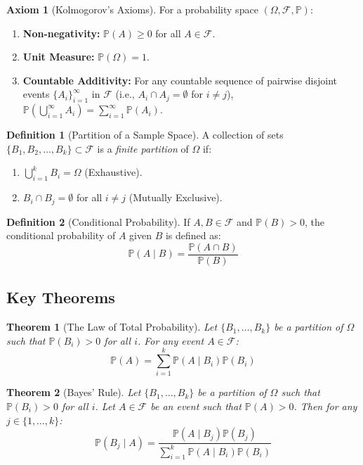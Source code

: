 \documentclass[12pt]{article}
\newtheorem{theorem}{Theorem}[section]
\theoremstyle{definition}
\newtheorem{definition}{Definition}[section]
\newtheorem{axiom}{Axiom}[section]
\theoremstyle{remark}
\newcommand{\Pbb}{\mathbb{P}}
\newcommand{\Fcal}{\mathcal{F}}
\newcommand{\OmegaSet}{\Omega}
\begin{document}
\begin{axiom}[Kolmogorov's Axioms]
For a probability space $(\OmegaSet, \Fcal, \Pbb)$:
\begin{enumerate}
    \item \textbf{Non-negativity:} $\Pbb(A) \ge 0$ for all $A \in \Fcal$.
    \item \textbf{Unit Measure:} $\Pbb(\OmegaSet) = 1$.
    \item \textbf{Countable Additivity:} For any countable sequence of pairwise disjoint events $\{A_i\}_{i=1}^{\infty}$ in $\Fcal$ (i.e., $A_i \cap A_j = \emptyset$ for $i \neq j$), $\Pbb\left(\bigcup_{i=1}^{\infty} A_i\right) = \sum_{i=1}^{\infty} \Pbb(A_i)$.
\end{enumerate}
\end{axiom}

\begin{definition}[Partition of a Sample Space]
A collection of sets $\{B_1, B_2, \dots, B_k\} \subset \Fcal$ is a \textit{finite partition} of $\OmegaSet$ if:
\begin{enumerate}
    \item $\bigcup_{i=1}^k B_i = \OmegaSet$ (Exhaustive).
    \item $B_i \cap B_j = \emptyset$ for all $i \neq j$ (Mutually Exclusive).
\end{enumerate}
\end{definition}

\begin{definition}[Conditional Probability]
If $A, B \in \Fcal$ and $\Pbb(B) > 0$, the conditional probability of $A$ given $B$ is defined as:
\[ \Pbb(A \mid B) = \frac{\Pbb(A \cap B)}{\Pbb(B)} \]
\end{definition}

\subsection{Key Theorems}
\begin{theorem}[The Law of Total Probability]
Let $\{B_1, \dots, B_k\}$ be a partition of $\OmegaSet$ such that $\Pbb(B_i) > 0$ for all $i$. For any event $A \in \Fcal$:
\[ \Pbb(A) = \sum_{i=1}^k \Pbb(A \mid B_i)\Pbb(B_i) \]
\end{theorem}

\begin{theorem}[Bayes' Rule]
Let $\{B_1, \dots, B_k\}$ be a partition of $\OmegaSet$ such that $\Pbb(B_i) > 0$ for all $i$. Let $A \in \Fcal$ be an event such that $\Pbb(A) > 0$. Then for any $j \in \{1, \dots, k\}$:
\[ \Pbb(B_j \mid A) = \frac{\Pbb(A \mid B_j)\Pbb(B_j)}{\sum_{i=1}^k \Pbb(A \mid B_i)\Pbb(B_i)} \]
\end{theorem}
\end{document}
